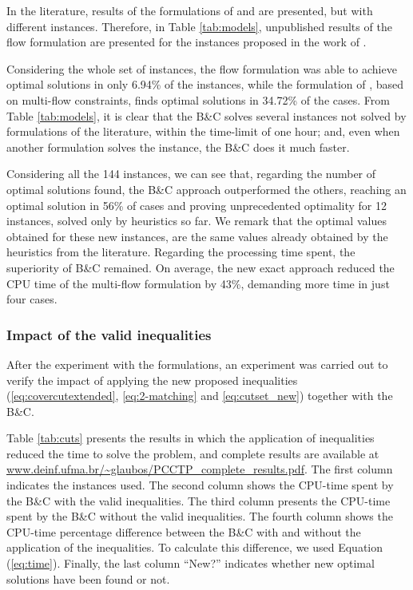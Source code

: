 \documentclass{singlecol-new}
\theoremstyle{TH}{
\newtheorem{lemma}{Lemma}
\newtheorem{theorem}[lemma]{Theorem}
\newtheorem{corrolary}[lemma]{Corrolary}
\newtheorem{conjecture}[lemma]{Conjecture}
\newtheorem{proposition}[lemma]{Proposition}
\newtheorem{claim}[lemma]{Claim}
\newtheorem{stheorem}[lemma]{Wrong Theorem}
}
\theoremstyle{THrm}{
\newtheorem{definition}{Definition}[section]
\newtheorem{question}{Question}[section]
\newtheorem{remark}{Remark}
\newtheorem{scheme}{Scheme}
}
\theoremstyle{THhit}{
\newtheorem{case}{Case}[section]
}
\begin{document}
In the literature, results of the formulations of \citet{lyra2004problema} and \citet{silva2009problema} are presented, but with different instances. Therefore, in Table \ref{tab:models}, unpublished results of the flow formulation \citep{lyra2004problema} are presented for the instances proposed in the work of \citet{silva2009problema}. 

Considering the whole set of instances, the flow formulation \citep{lyra2004problema} was able to achieve optimal solutions in only 6.94\% of the instances, while the formulation of \citet{silva2009problema}, based on multi-flow constraints, finds optimal solutions in 34.72\% of the cases. From Table \ref{tab:models}, it is clear that the B\&C solves several instances not solved by formulations of the literature, within the time-limit of one hour; and, even when another formulation solves the instance, the B\&C does it much faster. 

Considering all the 144 instances, we can see that, regarding the number of optimal solutions found, the B\&C approach outperformed the others, reaching an optimal solution in 56\% of cases and proving unprecedented optimality for 12 instances, solved only by heuristics so far. We remark that the optimal values obtained for these new instances, are the same values already obtained by the heuristics from the literature. Regarding the processing time spent, the superiority of B\&C remained. On average, the new exact approach reduced the CPU time of the multi-flow formulation by 43\%, demanding more time in just four cases.

\subsubsection{Impact of the valid inequalities}

After the experiment with the formulations, an experiment was carried out to verify the impact of applying the new proposed inequalities  (\ref{eq:covercutextended}, \ref{eq:2-matching} and \ref{eq:cutset_new}) together with the B\&C.

Table \ref{tab:cuts} presents the results in which the application of inequalities reduced the time to solve the problem, and complete results are available at \url{www.deinf.ufma.br/~glaubos/PCCTP_complete_results.pdf}. The first column indicates the instances used. The second column shows the CPU-time spent by the B\&C with the valid inequalities. The third column presents the CPU-time spent by the B\&C without the valid inequalities. The fourth column shows the CPU-time percentage difference between the B\&C with and without the application of the inequalities. To calculate this difference, we used Equation (\ref{eq:time}). Finally, the last column ``New?'' indicates whether new optimal solutions have been found or not.
\end{document}
